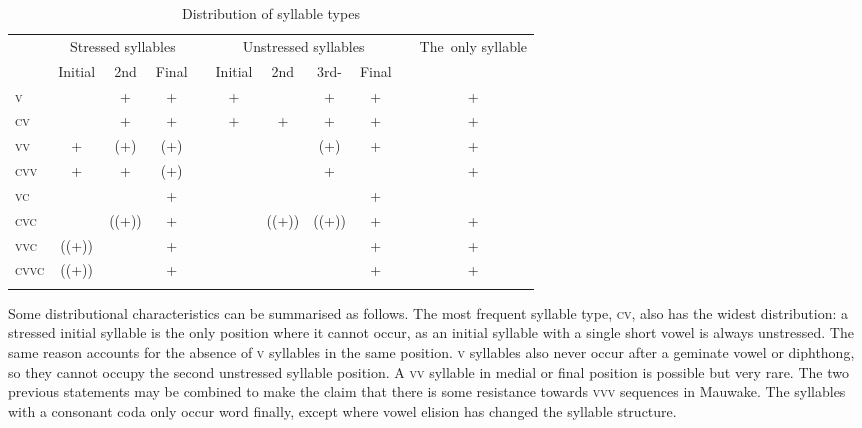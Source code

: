 \begin{table}
\caption{Distribution of syllable types}
\label{tab:7:syllabletypes}
  \begin{tabular}{lcccccccccc}
  \mytoprule
  \multirow{2}{*}{\parbox{1cm}{Syllable\\type}} & \multicolumn{3}{c}{Stressed syllables} &  & \multicolumn{4}{c}{Unstressed syllables}  &  & \multirow{2}{*}{\parbox{1.2cm}{\mbox{The only} \mbox{syllable}}}\\
  & Initial & 2nd{\footnotemark} & Final &  & Initial & 2nd & 3rd- & Final &  & \\
  \midrule
  \textsc{v} &  & + & + &  & + &  & + & + &  & +\\
  \textsc{cv} &  & + & + &  & + & + & + & + &  & +\\
  \textsc{vv} & + & (+) & (+) &  &  &  & (+) & + &  & +\\
  \textsc{cvv} & + & + & (+) &  &  &  & + &  &  & +\\
  \textsc{vc} &  &  & + &  &  &  &  & + &  & \\
  \textsc{cvc} &  & ((+)) & + &  &  & ((+)) & ((+)) & + &  & +\\
  \textsc{vvc} & ((+)) &  & + &  &  &  &  & + &  & +\\
  \textsc{cvvc} & ((+)) &  & + &  &  &  &  & + &  & +\\
  \mybottomrule
  \end{tabular}
\end{table}







Some distributional characteristics can be summarised as follows.  The most frequent syllable type, \textsc{cv}, also has the widest distribution: a stressed initial syllable is the only position where it cannot occur, as an initial syllable with a single short vowel is always unstressed. The same reason accounts for the absence of \textsc{v} syllables in the same position. \textsc{v} syllables also never occur after a geminate vowel or diphthong, so they cannot occupy the second unstressed syllable position. A \textsc{vv} syllable in medial or final position is possible but very rare. The two previous statements may be combined to make the claim that there is some resistance towards \textsc{vvv} sequences in Mauwake. The syllables with a consonant coda only occur word finally, except where vowel elision has changed the syllable structure.  

